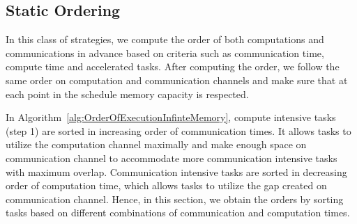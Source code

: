 \documentclass[runningheads]{llncs} %
\begin{document}
\subsection{Static Ordering}
In this class of strategies, we compute the order of both computations and communications in advance based on criteria such as communication time, compute time and accelerated tasks. After computing the order, we follow the same order on computation and communication channels and make sure that at each point in the schedule memory capacity is respected.


In Algorithm~\ref{alg:OrderOfExecutionInfinteMemory}, compute intensive tasks (step 1) are sorted in increasing order of communication times. It allows tasks to utilize the computation channel maximally and make enough space on communication channel to accommodate more communication intensive tasks with maximum overlap. Communication intensive tasks are sorted in decreasing order of computation time, which allows tasks to utilize the gap created on communication channel. Hence,  in this section, we obtain the orders by sorting tasks based on different combinations of communication and computation times.
\end{document}
